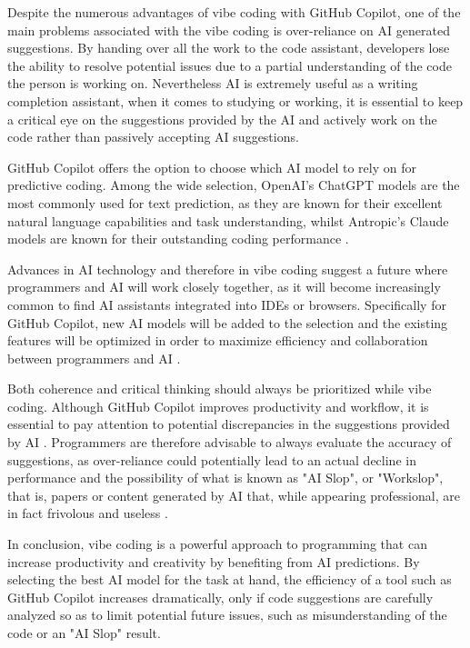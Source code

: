 \documentclass{article}
\begin{document}
Despite the numerous advantages of vibe coding with GitHub Copilot, one of
the main problems associated with the vibe coding is over-reliance on
AI generated suggestions. By handing over all the work to the code assistant,
developers lose the ability to resolve potential issues due to a partial
understanding of the code the person is working on. Nevertheless AI is
extremely useful as a writing completion assistant, when it comes to studying
or working, it is essential to keep a critical eye on the suggestions provided
by the AI and actively work on the code rather than passively accepting AI
suggestions.
\vspace*{.25cm}

GitHub Copilot offers the option to choose which AI model to rely on for
predictive coding. Among the wide selection, OpenAI's ChatGPT models are the
most commonly used for text prediction, as they are known for their
excellent natural language capabilities and task understanding, whilst
Antropic's Claude models are known for their outstanding coding performance
\parencite{github-models}.
\vspace*{.25cm}

\newpage
\thispagestyle{plain}
Advances in AI technology and therefore in vibe coding suggest a future where
programmers and AI will work closely together, as it will become increasingly
common to find AI assistants integrated into IDEs or browsers. Specifically
for GitHub Copilot, new AI models will be added to the selection and the
existing features will be optimized in order to maximize efficiency and
collaboration between programmers and AI \parencite{github-discussion}.
\vspace*{.25cm}

Both coherence and critical thinking should always be prioritized while vibe
coding. Although GitHub Copilot improves productivity and workflow, it is
essential to pay attention to potential discrepancies in the suggestions
provided by AI \parencite{github-guide}. Programmers are therefore advisable
to always evaluate the accuracy of suggestions, as over-reliance could
potentially lead to an actual decline in performance and the possibility of
what is known as "AI Slop", or "Workslop", that is, papers or content generated
by AI that, while appearing professional, are in fact frivolous and useless
\parencite{NiederhofferEtAl2025}.
\vspace*{.25cm}

In conclusion, vibe coding is a powerful approach to programming that can
increase productivity and creativity by benefiting from AI predictions.
By selecting the best AI model for the task at hand, the efficiency of a tool
such as GitHub Copilot increases dramatically, only if code suggestions are
carefully analyzed so as to limit potential future issues, such as
misunderstanding of the code or an "AI Slop" result.
\end{document}
